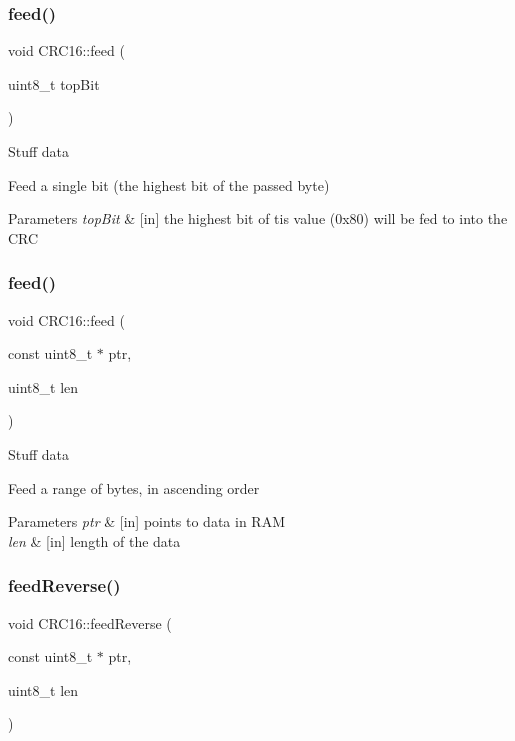 \subsubsection{\texorpdfstring{feed()}{feed()}\hspace{0.1cm}{\footnotesize\ttfamily [1/2]}}
{\footnotesize\ttfamily void C\+R\+C16\+::feed (\begin{DoxyParamCaption}\item[{uint8\+\_\+t}]{top\+Bit }\end{DoxyParamCaption})}

Stuff data

Feed a single bit (the highest bit of the passed byte) 
\begin{DoxyParams}{Parameters}
{\em top\+Bit} & \mbox{[}in\mbox{]} the highest bit of tis value (0x80) will be fed to into the C\+RC \\
\hline
\end{DoxyParams}
\mbox{\label{class_c_r_c16_a05d38b0d782f465ea7345c3ed7cafbaf}} 
\subsubsection{\texorpdfstring{feed()}{feed()}\hspace{0.1cm}{\footnotesize\ttfamily [2/2]}}
{\footnotesize\ttfamily void C\+R\+C16\+::feed (\begin{DoxyParamCaption}\item[{const uint8\+\_\+t $\ast$}]{ptr,  }\item[{uint8\+\_\+t}]{len }\end{DoxyParamCaption})}

Stuff data

Feed a range of bytes, in ascending order 
\begin{DoxyParams}{Parameters}
{\em ptr} & \mbox{[}in\mbox{]} points to data in R\+AM \\
\hline
{\em len} & \mbox{[}in\mbox{]} length of the data \\
\hline
\end{DoxyParams}
\mbox{\label{class_c_r_c16_a01cc3efe20c96193f230f4ec9cb43c74}} 
\subsubsection{\texorpdfstring{feed\+Reverse()}{feedReverse()}}
{\footnotesize\ttfamily void C\+R\+C16\+::feed\+Reverse (\begin{DoxyParamCaption}\item[{const uint8\+\_\+t $\ast$}]{ptr,  }\item[{uint8\+\_\+t}]{len }\end{DoxyParamCaption})}

